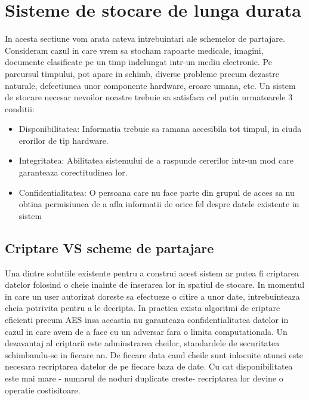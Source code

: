 \documentclass{llncs}
\begin{document}



\section{Sisteme de stocare de lunga durata}

In acesta sectiune vom arata cateva intrebuintari ale schemelor de partajare. Consideram cazul in care vrem sa stocham rapoarte medicale, imagini, documente clasificate pe un timp indelungat intr-un mediu electronic. Pe parcursul timpului, pot apare in schimb, diverse probleme precum dezastre naturale, defectiunea unor componente hardware, eroare umana, etc. \cite{SGMV:2009}
Un sistem de stocare necesar nevoilor noastre trebuie sa satisfaca cel putin urmatoarele 3 conditii:
\begin{itemize}
	\item Disponibilitatea: Informatia trebuie sa ramana accesibila tot timpul, in ciuda erorilor de tip hardware.
	\item Integritatea: Abilitatea sistemului de a raspunde cererilor intr-un mod care garanteaza corectitudinea lor.
	\item Confidentialitatea: O persoana care nu face parte din grupul de acces sa nu obtina permisiunea de a afla informatii de orice fel despre datele existente in sistem
\end{itemize}

\subsection{Criptare VS scheme de partajare}


Una dintre solutiile existente pentru a construi acest sistem ar putea fi criptarea datelor folosind o cheie inainte de inserarea lor in spatiul de stocare. In momentul in care un user autorizat doreste sa efectueze o citire a unor date, intrebuinteaza cheia potrivita pentru a le decripta.
In practica exista algoritmi de criptare eficienti precum AES insa aceastia nu garanteaza confidentialitatea datelor in cazul in care avem de a face cu un adversar fara o limita computationala. Un dezavantaj al criptarii este adminstrarea cheilor, standardele de securitatea schimbandu-se in fiecare an.
De fiecare data cand cheile sunt inlocuite atunci este necesara recriptarea datelor de pe fiecare baza de date. Cu cat disponibilitatea este mai mare - numarul de noduri duplicate creste- recriptarea lor devine o operatie costisitoare. 
\end{document}
